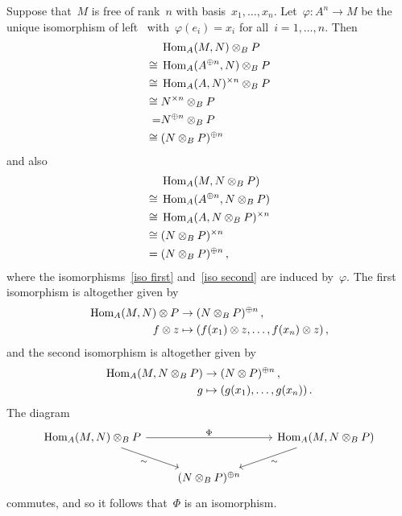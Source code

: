 Suppose that~$M$ is free of rank~$n$ with basis~$x_1, \dotsc, x_n$.
Let~$\varphi \colon A^n \to M$ be the unique isomorphism of left~{} with~$\varphi(e_i) = x_i$ for all~$i = 1, \dotsc, n$.
Then
\begin{align}
       {}&  \operatorname{Hom}_A(M, N) \otimes_B P  \notag  \\
  \cong{}&  \operatorname{Hom}_A(A^{\oplus n}, N) \otimes_B P \label{iso first} \\
  \cong{}&  \operatorname{Hom}_A(A, N)^{\times n} \otimes_B P \notag  \\
  \cong{}&  N^{\times n} \otimes_B P  \notag  \\
        =&  N^{\oplus n} \otimes_B P  \notag  \\
  \cong{}&  (N \otimes_B P)^{\oplus n}  \notag
\end{align}
and also
\begin{align}
       {}&  \operatorname{Hom}_A(M, N \otimes_B P)  \notag  \\
  \cong{}&  \operatorname{Hom}_A(A^{\oplus n}, N \otimes_B P) \label{iso second}  \\
  \cong{}&  \operatorname{Hom}_A(A, N \otimes_B P)^{\times n} \notag  \\
  \cong{}&  (N \otimes_B P)^{\times n}  \notag  \\
      ={}&  (N \otimes_B P)^{\oplus n}  \notag  \,,
\end{align}
where the isomorphisms~\eqref{iso first} and~\eqref{iso second} are induced by~$\varphi$.
The first isomorphism is altogether given by
\begin{align*}
            \operatorname{Hom}_A(M, N) \otimes P
  &\to      (N \otimes_B P)^{\oplus n} \,,
  \\
            f \otimes z
  &\mapsto  ( f(x_1) \otimes z, \dotsc, f(x_n) \otimes z ) \,,
\end{align*}
and the second isomorphism is altogether given by
\begin{align*}
            \operatorname{Hom}_A(M, N \otimes_B P)
  &\to      (N \otimes P)^{\oplus n} \,,
  \\
            g
  &\mapsto  ( g(x_1), \dotsc, g(x_n) ) \,.
\end{align*}
The diagram
\[
  \begin{tikzcd}
      \Hom_A(M, N) \tensor_B P
      \arrow{dr}[below left]{\sim}
      \arrow{rr}[above]{\Phi}
    & {}
    & \Hom_A(M, N \tensor_B P)
      \arrow{dl}[below right]{\sim}
    \\
      {}
    & (N \tensor_B P)^{\oplus n}
    & {}
  \end{tikzcd}
\]
commutes, and so it follows that~$\Phi$ is an isomorphism.






